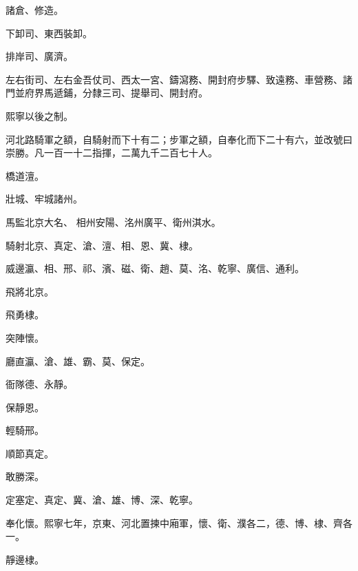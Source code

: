 \begin{pinyinscope}
 諸倉、修造。



 下卸司、東西裝卸。



 排岸司、廣濟。



 左右街司、左右金吾仗司、西太一宮、鑄瀉務、開封府步驛、致遠務、車營務、諸門並府界馬遞鋪，分隸三司、提舉司、開封府。



 熙寧以後之制。



 河北路騎軍之額，自騎射而下十有二；步軍之額，自奉化而下二十有六，並改號曰崇勝。凡一百一十二指揮，二萬九千二百七十人。



 橋道澶。



 壯城、牢城諸州。



 馬監北京大名、
 相州安陽、洺州廣平、衛州淇水。



 騎射北京、真定、滄、澶、相、恩、冀、棣。



 威邊瀛、相、邢、祁、濱、磁、衛、趙、莫、洺、乾寧、廣信、通利。



 飛將北京。



 飛勇棣。



 突陣懷。



 廳直瀛、滄、雄、霸、莫、保定。



 衙隊德、永靜。



 保靜恩。



 輕騎邢。



 順節真定。



 敢勝深。



 定塞定、真定、冀、滄、雄、博、深、乾寧。



 奉化懷。熙寧七年，京東、河北置揀中廂軍，懷、衛、濮各二，德、博、棣、齊各一。



 靜邊棣。




\end{pinyinscope}
